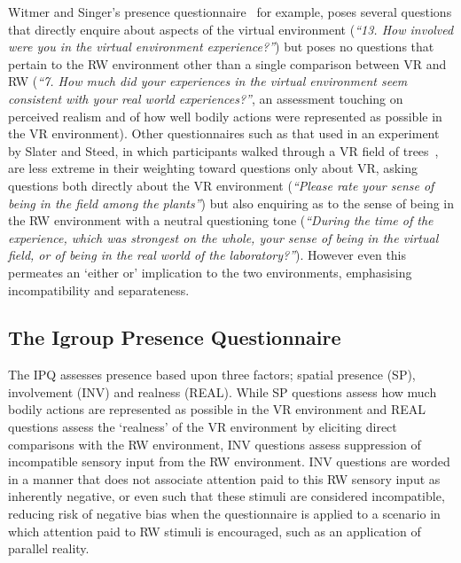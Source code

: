 Witmer and Singer's presence questionnaire~\cite{Witmer1998} for example, poses several questions that directly enquire about aspects of the virtual environment (\textit{``13. How involved were you in the virtual environment experience?''}) but poses no questions that pertain to the RW environment other than a single comparison between VR and RW (\textit{``7. How much did your experiences in the virtual environment seem consistent with your real world experiences?''}, an assessment touching on perceived realism and of how well bodily actions were represented as possible in the VR environment). Other questionnaires such as that used in an experiment by Slater and Steed, in which participants walked through a VR field of trees~\cite{Slater1998}, are less extreme in their weighting toward questions only about VR, asking questions both directly about the VR environment (\textit{``Please rate your sense of being in the field among the plants''}) but also enquiring as to the sense of being in the RW environment with a neutral questioning tone (\textit{``During the time of the experience, which was strongest on the whole, your sense of being in the virtual field, or of being in the real world of the laboratory?''}). However even this permeates an `either or' implication to the two environments, emphasising incompatibility and separateness.


\subsection{The Igroup Presence Questionnaire}
\label{igroup-presence-questionnaire-explanation}
The IPQ assesses presence based upon three factors; spatial presence (SP), involvement (INV) and realness (REAL). While SP questions assess how much bodily actions are represented as possible in the VR environment and REAL questions assess the `realness' of the VR environment by eliciting direct comparisons with the RW environment, INV questions assess suppression of incompatible sensory input from the RW environment. INV questions are worded in a manner that does not associate attention paid to this RW sensory input as inherently negative, or even such that these stimuli are considered incompatible, reducing risk of negative bias when the questionnaire is applied to a scenario in which attention paid to RW stimuli is encouraged, such as an application of parallel reality.

